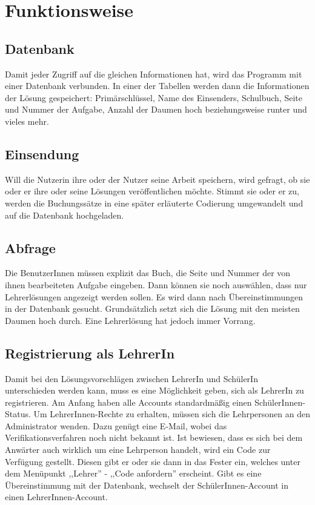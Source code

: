 \documentclass[12pt]{report}
\begin{document}
\section{Funktionsweise}

\subsection{Datenbank}
Damit jeder Zugriff auf die gleichen Informationen hat, wird das Programm mit einer Datenbank verbunden. In einer der Tabellen werden dann die Informationen der Lösung gespeichert: Primärschlüssel, Name des Einsenders, Schulbuch, Seite und Nummer der Aufgabe, Anzahl der Daumen hoch beziehungsweise runter und vieles mehr.

\subsection{Einsendung}
Will die Nutzerin ihre oder der Nutzer seine Arbeit speichern, wird gefragt, ob sie oder er ihre oder seine Lösungen veröffentlichen möchte. Stimmt sie oder er zu, werden die Buchungssätze in eine später erläuterte Codierung umgewandelt und auf die Datenbank hochgeladen.

\subsection{Abfrage}
Die BenutzerInnen müssen explizit das Buch, die Seite und Nummer der von ihnen bearbeiteten Aufgabe eingeben. Dann können sie noch auswählen, dass nur Lehrerlösungen angezeigt werden sollen. Es wird dann nach Übereinstimmungen in der Datenbank gesucht. Grundsätzlich setzt sich die Lösung mit den meisten Daumen hoch durch. Eine Lehrerlösung hat jedoch immer Vorrang.

\subsection{Registrierung als LehrerIn}
Damit bei den Lösungsvorschlägen zwischen LehrerIn und SchülerIn unterschieden werden kann, muss es eine Möglichkeit geben, sich als LehrerIn zu registrieren. Am Anfang haben alle Accounts standardmäßig einen SchülerInnen-Status. Um LehrerInnen-Rechte zu erhalten, müssen  sich die Lehrpersonen an den Administrator wenden. Dazu genügt eine E-Mail, wobei das Verifikationsverfahren noch nicht bekannt ist. Ist bewiesen, dass es sich bei dem Anwärter auch wirklich um eine Lehrperson handelt, wird ein Code zur Verfügung gestellt. Diesen gibt er oder sie dann in das Fester ein, welches unter dem Menüpunkt ,,Lehrer'' - ,,Code anfordern'' erscheint. Gibt es eine Übereinstimmung mit der Datenbank, wechselt der SchülerInnen-Account in einen LehrerInnen-Account.   
\end{document}
